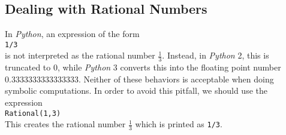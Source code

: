 \documentclass{report}
\newcommand{\ds}{\displaystyle}
\begin{document}
\subsection{Dealing with Rational Numbers}
In \textsl{Python}, an expression of the form 
\\[0.2cm]
\hspace*{1.3cm}
\texttt{1/3}
\\[0.2cm]
is not interpreted as the rational number $\frac{1}{3}$.  Instead, in \textsl{Python} 2, this
is truncated to $0$, while \textsl{Python} 3 converts this into the floating point number
$0.3333333333333333$.  Neither of these behaviors is acceptable when doing symbolic computations.
In order to avoid this pitfall, we should use the expression 
\\[0.2cm]
\hspace*{1.3cm}
\texttt{Rational(1,3)}
\\[0.2cm]
This creates the rational number $\ds\frac{1}{3}$ which is printed as \texttt{1/3}.
\end{document}

